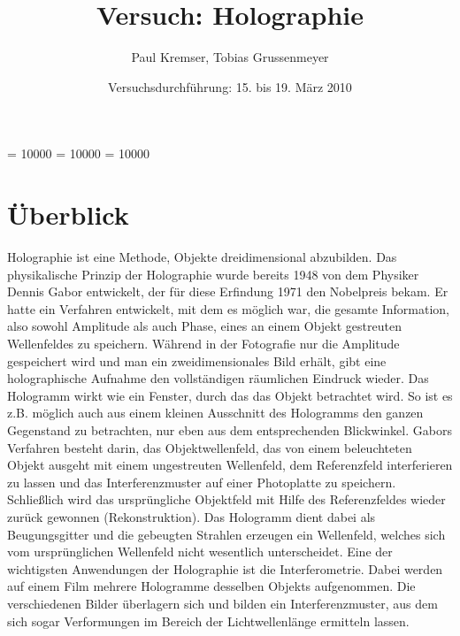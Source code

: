 \documentclass[12pt]{article}
\newcommand{\changefont}[3]{
\fontfamily{#1} \fontseries{#2} \fontshape{#3} \selectfont}
\begin{document}
\clubpenalty = 10000
\widowpenalty = 10000 
\displaywidowpenalty = 10000

\onehalfspacing
\changefont{ptm}{m}{n} 

\begin{titlepage}
\author{Paul Kremser, Tobias Grussenmeyer}
\title{Versuch: Holographie}
\date{Versuchsdurchführung: 15. bis 19. März 2010} 
\maketitle
\thispagestyle{empty}
\end{titlepage}


\tableofcontents
\thispagestyle{empty}
\newpage
{}
\section{Überblick}
Holographie ist eine Methode, Objekte dreidimensional abzubilden. Das physikalische Prinzip
der Holographie wurde bereits 1948 von dem Physiker Dennis Gabor entwickelt, der für diese
Erfindung 1971 den Nobelpreis bekam. Er hatte ein
Verfahren entwickelt, mit dem es möglich war, die gesamte Information, also sowohl Amplitude
als auch Phase, eines an einem Objekt gestreuten Wellenfeldes zu speichern.
Während in der Fotografie nur die Amplitude gespeichert wird und man ein zweidimensionales Bild
erhält, gibt eine holographische Aufnahme den vollständigen räumlichen Eindruck wieder. Das Hologramm
wirkt wie ein Fenster, durch das das Objekt betrachtet wird. So ist es
z.B. möglich auch aus einem kleinen Ausschnitt des Hologramms den ganzen Gegenstand zu betrachten,
nur eben aus dem entsprechenden Blickwinkel. Gabors Verfahren besteht
darin, das Objektwellenfeld, das von einem beleuchteten Objekt ausgeht mit einem ungestreuten Wellenfeld, dem Referenzfeld
interferieren zu lassen und das Interferenzmuster auf einer Photoplatte zu speichern. 
Schließlich wird das ursprüngliche Objektfeld mit Hilfe des Referenzfeldes wieder zurück gewonnen (Rekonstruktion). Das Hologramm dient dabei als
Beugungsgitter und die gebeugten Strahlen erzeugen ein Wellenfeld, welches sich vom ursprünglichen Wellenfeld nicht wesentlich unterscheidet.
Eine der wichtigsten Anwendungen der Holographie ist die Interferometrie. Dabei werden auf
einem Film mehrere Hologramme desselben Objekts aufgenommen. Die verschiedenen Bilder
überlagern sich und bilden ein Interferenzmuster, aus dem sich sogar Verformungen im Bereich
der Lichtwellenlänge ermitteln lassen.
\end{document}

